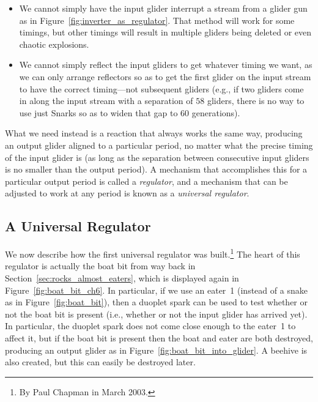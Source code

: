 \begin{itemize}
	\item We cannot simply have the input glider interrupt a stream from a glider gun as in Figure~\ref{fig:inverter_as_regulator}. That method will work for some timings, but other timings will result in multiple gliders being deleted or even chaotic explosions.\smallskip
	
	\item We cannot simply reflect the input gliders to get whatever timing we want, as we can only arrange reflectors so as to get the first glider on the input stream to have the correct timing---not subsequent gliders (e.g., if two gliders come in along the input stream with a separation of $58$ gliders, there is no way to use just Snarks so as to widen that gap to $60$ generations).\smallskip
\end{itemize}

What we need instead is a reaction that always works the same way, producing an output glider aligned to a particular period, no matter what the precise timing of the input glider is (as long as the separation between consecutive input gliders is no smaller than the output period). A mechanism that accomplishes this for a particular output period is called a \emph{regulator}, and a mechanism that can be adjusted to work at any period is known as a \emph{universal regulator}.


\subsection{A Universal Regulator}\label{sec:chapman_universal_regulator}

We now describe how the first universal regulator was built.\footnote{By Paul Chapman in March 2003.} The heart of this regulator is actually the boat bit from way back in Section~\ref{sec:rocks_almost_eaters}, which is displayed again in Figure~\ref{fig:boat_bit_ch6}. In particular, if we use an eater~1 (instead of a snake as in Figure~\ref{fig:boat_bit}), then a duoplet spark can be used to test whether or not the boat bit is present (i.e., whether or not the input glider has arrived yet). In particular, the duoplet spark does not come close enough to the eater~1 to affect it, but if the boat bit is present then the boat and eater are both destroyed, producing an output glider as in Figure~\ref{fig:boat_bit_into_glider}. A beehive is also created, but this can easily be destroyed later.

